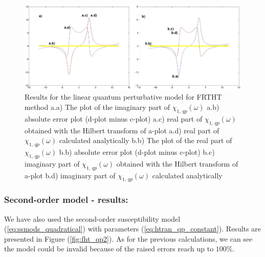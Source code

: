 \documentclass[12pt,twoside,a4paper]{article}
\numberwithin{equation}{subsection}
\numberwithin{figure}{subsection}
\begin{document}
\begin{figure}
  \includegraphics[width=150mm]{img/fht_qp1.png}
  \caption{Results for the linear quantum perturbative model for FRTHT method
    a.a) The plot of the imaginary part of ${\chi_{1, \,qp}}(\omega )$
    a.b) absolute error plot (d-plot minus c-plot) 
    a.c) real part of $\chi_{1, \, qp} (\omega )$ obtained with the Hilbert transform of a-plot 
    a.d) real part of $\chi_{1, \, qp} (\omega )$ calculated analytically 
    b.b) The plot of the real part of $ \chi_{1, \, qp} (\omega )$ 
    b.b) absolute error plot (d-plot minus c-plot) 
    b.c) imaginary part of $\chi_{1, \, qp} (\omega )$ obtained with the Hilbert transform of a-plot 
    b.d) imaginary part of $\chi_{1, \, qp} (\omega )$ calculated analytically  
    \label{fig:fht_qp1}
  }
\end{figure}

\subsubsection*{Second-order model - results:}

We have also used the second-order susceptibility model  (\ref{eq:ssmods_quadratical}) with parameters (\ref{eq:htran_qp_constant}). Results are presented in Figure (\ref{fig:fht_qp2}). As for the previous calculations, we can see the model could be invalid because of the raised errors reach up to $ 100 \% $.
\end{document}
